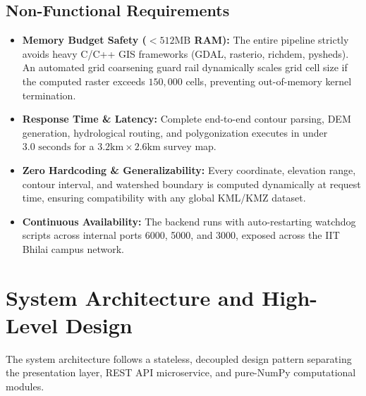 \documentclass[manuscript,screen,review]{acmart}
\begin{document}
\subsection{Non-Functional Requirements}
\begin{itemize}[noitemsep]
    \item \textbf{Memory Budget Safety ($<512\text{MB}$ RAM):} The entire pipeline strictly avoids heavy C/C++ GIS frameworks (GDAL, rasterio, richdem, pysheds). An automated grid coarsening guard rail dynamically scales grid cell size if the computed raster exceeds $150,000$ cells, preventing out-of-memory kernel termination.
    \item \textbf{Response Time \& Latency:} Complete end-to-end contour parsing, DEM generation, hydrological routing, and polygonization executes in under $3.0\text{ seconds}$ for a $3.2\text{km} \times 2.6\text{km}$ survey map.
    \item \textbf{Zero Hardcoding \& Generalizability:} Every coordinate, elevation range, contour interval, and watershed boundary is computed dynamically at request time, ensuring compatibility with any global KML/KMZ dataset.
    \item \textbf{Continuous Availability:} The backend runs with auto-restarting watchdog scripts across internal ports 6000, 5000, and 3000, exposed across the IIT Bhilai campus network.
\end{itemize}

\section{System Architecture and High-Level Design}
\label{sec:architecture}

The system architecture follows a stateless, decoupled design pattern separating the presentation layer, REST API microservice, and pure-NumPy computational modules.
\end{document}
